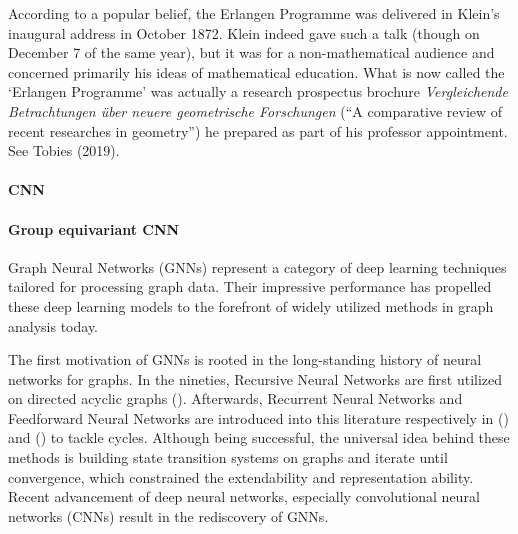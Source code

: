 \documentclass[binding=0.6cm]{sapthesis}
\begin{document}
According to a popular belief, the Erlangen Programme was delivered in Klein’s inaugural address in October 1872. Klein indeed gave such a talk (though on December 7 of the same year), but it was for a non-mathematical audience and concerned primarily his ideas of mathematical education. What is now called the ‘Erlangen Programme’ was actually a research prospectus brochure \textit{Vergleichende Betrachtungen über neuere geometrische Forschungen} (“A comparative review of recent researches in geometry”) he prepared as part of his professor appointment. See Tobies (2019).


\paragraph{CNN}
\label{sec:bg.gnn.cnn}
\paragraph{Group equivariant CNN}
\label{sec:bg.gnn.geCNN}

Graph Neural Networks (GNNs) represent a category of deep learning techniques tailored for processing graph data. Their impressive performance has propelled these deep learning models to the forefront of widely utilized methods in graph analysis today. 

The first motivation of GNNs is rooted in the long-standing history of neural networks for graphs. In the nineties, Recursive Neural Networks are first utilized on directed acyclic graphs (\cite{Sperduti1997,Frasconi1998}). Afterwards, Recurrent Neural Networks and Feedforward Neural Networks are introduced into this literature respectively in (\cite{gnnModel2009}) and (\cite{Micheli2009}) to tackle cycles. Although being successful, the universal idea behind these methods is building state transition systems on graphs and iterate until convergence, which constrained the extendability and representation ability. Recent advancement of deep neural networks, especially convolutional neural networks (CNNs) result in the rediscovery of GNNs. 
\end{document}
